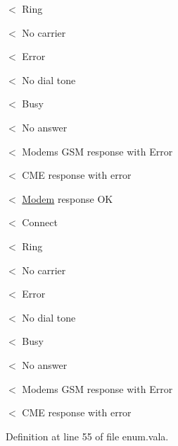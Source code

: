 $<$ Ring

$<$ No carrier

$<$ Error

$<$ No dial tone

$<$ Busy

$<$ No answer

$<$ Modems G\-S\-M response with Error

$<$ C\-M\-E response with error

$<$ \hyperlink{classedwinspire_1_1_ports_1_1_modem}{Modem} response O\-K

$<$ Connect

$<$ Ring

$<$ No carrier

$<$ Error

$<$ No dial tone

$<$ Busy

$<$ No answer

$<$ Modems G\-S\-M response with Error

$<$ C\-M\-E response with error 

Definition at line 55 of file enum.\-vala.


